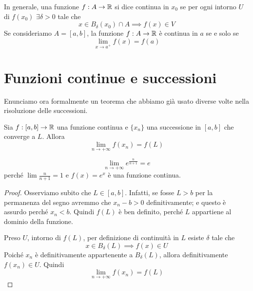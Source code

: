 In generale, una funzione $f: A \to \mathbb R$ si dice continua in $x_0$ se per ogni intorno $U$ di $f(x_0)$ $\exists \delta > 0$ tale che
\begin{equation*}
x \in B_\delta (x_0) \cap A \implies f(x) \in V
\end{equation*}
Se consideriamo $A = [a, b]$, la funzione $f:A \to \mathbb R$ è continua in $a$ se e solo se
\begin{equation*}
\lim_{x \to a^+} f(x) = f(a)
\end{equation*}

\section{Funzioni continue e successioni}
Enunciamo ora formalmente un teorema che abbiamo già usato diverse volte nella risoluzione delle successioni.

\begin{theorem}
Sia $f: [a, b] \to \mathbb R$ una funzione continua e $\{x_n\}$ una successione in $[a, b]$ che converge a $L$. Allora
\begin{equation*}
\lim_{n \to +\infty} f(x_n) = f(L)
\end{equation*}
\end{theorem}

\begin{example}
\begin{equation*}
\lim_{n \to +\infty} e^\frac{n}{n + 1} = e
\end{equation*}
perché $\lim \frac{n}{n+1} = 1$ e $f(x) = e^x$ è una funzione continua.
\end{example}

\begin{proof}
Osserviamo subito che $L \in [a, b]$. Infatti, se fosse $L > b$ per la permanenza del segno avremmo che $x_n - b > 0$ definitivamente; e questo è assurdo perché $x_n < b$. Quindi $f(L)$ è ben definito, perché $L$ appartiene al dominio della funzione.

Preso $U$, intorno di $f(L)$, per definizione di continuità in $L$ esiste $\delta$ tale che
\begin{equation*}
x \in B_\delta (L) \implies f(x) \in U
\end{equation*}
Poiché $x_n$ è definitivamente appartenente a $B_\delta (L)$, allora definitivamente $f(x_n) \in U$. Quindi
\begin{equation*}
\lim_{n \to +\infty} f(x_n) = f(L)
\end{equation*}
\end{proof}